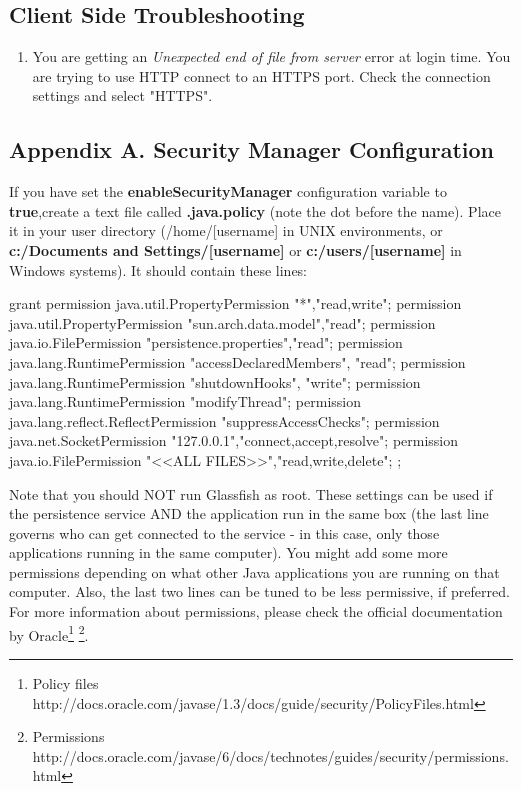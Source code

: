 \documentclass[a4paper]{article}
\begin{document}
				\subsection{Client Side Troubleshooting}
				\begin{enumerate}
					\item You are getting an \textit{Unexpected end of file from server} error at login time. You are trying to use HTTP connect to an HTTPS port. Check the connection settings and select "HTTPS".
				\end{enumerate}
		\newpage
		\begin{appendices}
			\appendix
			\section{Appendix A. Security Manager Configuration} \label{app:AppendixA}
			If you have set the \textbf{enableSecurityManager} configuration variable to \textbf{true},create a text file called \textbf{.java.policy} (note the dot before the name). Place it in your user directory (/home/[username] in UNIX environments, or \textbf{c:/Documents and Settings/[username]} or \textbf{c:/users/[username]} in Windows systems). It should contain these lines:
			
			\begin{verbbox}
				grant {
					permission java.util.PropertyPermission "*","read,write";
					permission java.util.PropertyPermission "sun.arch.data.model","read";
					permission java.io.FilePermission "persistence.properties","read";
					permission java.lang.RuntimePermission "accessDeclaredMembers", "read";
					permission java.lang.RuntimePermission "shutdownHooks", "write";
					permission java.lang.RuntimePermission "modifyThread";
					permission java.lang.reflect.ReflectPermission "suppressAccessChecks";
					permission java.net.SocketPermission "127.0.0.1","connect,accept,resolve";
					permission java.io.FilePermission "<<ALL FILES>>","read,write,delete";
				};
			\end{verbbox}
			\begin{figure}[ht]
				\centering	
				\theverbbox
			\end{figure}
			Note that you should NOT run Glassfish as root. These settings can be used if the persistence service AND the application run in the same box (the last line governs who can get connected to the service - in this case, only those applications running in the same computer). You might add some more permissions depending on what other Java applications you are running on that computer. Also, the last two lines can be tuned to be less permissive, if preferred. For more information about permissions, please check the official documentation by Oracle\footnote{Policy files http://docs.oracle.com/javase/1.3/docs/guide/security/PolicyFiles.html} \footnote{Permissions http://docs.oracle.com/javase/6/docs/technotes/guides/security/permissions.html}.
			

\end{appendices}
\end{document}
